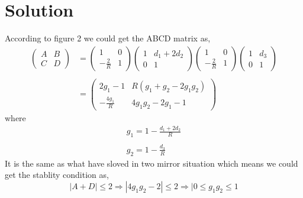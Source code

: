 \documentclass{article}
\begin{document}
\section*{Solution}
According to figure 2 we could get the ABCD matrix as,
\begin{equation}
	\begin{aligned}
	\begin{pmatrix}
	A & B\\
	C & D 
	\end{pmatrix}
	&=\begin{pmatrix}
	1 & 0\\
	-\frac{2}{R} & 1
	\end{pmatrix}
	\begin{pmatrix}
	1 & d_1+2d_2\\
	0 & 1
	\end{pmatrix}
	\begin{pmatrix}
	1 & 0\\
	-\frac{2}{R} & 1
	\end{pmatrix}
	\begin{pmatrix}
	1 & d_3\\
	0 & 1
	\end{pmatrix}\\
	\\
	&=\begin{pmatrix}
	2g_1-1 & R(g_1+g_2-2g_1g_2)\\
	-\frac{4g_1}{R} & 4g_1g_2-2g_1-1
	\end{pmatrix}
	\end{aligned}
\end{equation}
where 
\begin{equation}
\begin{array}{l}
g_1=1-\frac{d_1+2d_2}{R}\\
\\
g_2=1-\frac{d_3}{R}
\end{array}
\end{equation}
It is the same as what have sloved in two mirror situation  which means we could get the stablity condition as,
\begin{equation}
|A+D|\leq2\Rightarrow|4g_1g_2-2|\leq2\Rightarrow|0\leq g_1g_2\leq 1
\end{equation}
\end{document}
